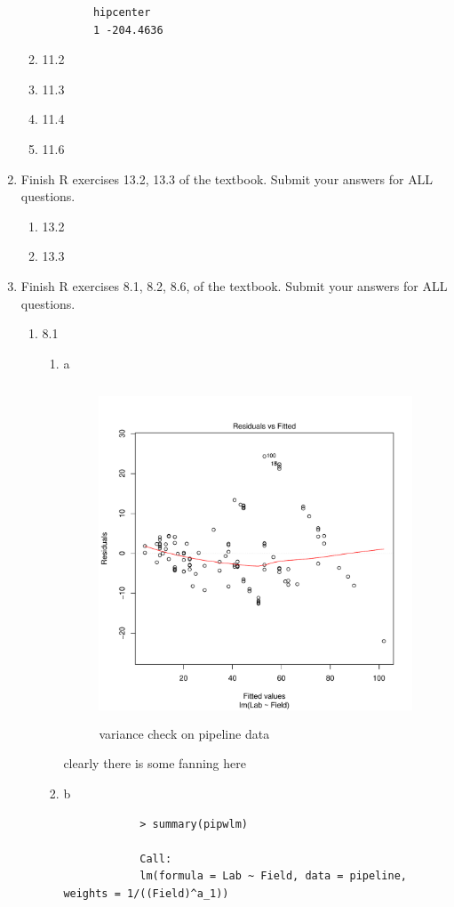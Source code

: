 \documentclass[11pt]{article}
\begin{document}
\begin{enumerate}
\begin{enumerate}
\begin{verbatim}
		hipcenter
		1 -204.4636
	\end{verbatim}
	\item 11.2
	\item 11.3
	\item 11.4
	\item 11.6
\end{enumerate}
\item  Finish R exercises 13.2, 13.3 of the textbook. Submit your
answers for {\color{red}ALL} questions. 
\begin{enumerate}
	\item 13.2
	\item 13.3
\end{enumerate}
\item  Finish R exercises  8.1, 8.2, 8.6, of the textbook. Submit your
answers for {\color{red}ALL} questions. 
\begin{enumerate}
	\item 8.1
	\begin{enumerate}
		\item a
		\begin{figure}[H]
			\centering
			\includegraphics[width=10cm,height=10cm]{pipelinevar.pdf}
			\caption[paic]{variance check on pipeline data}
			\label{divusav}
		\end{figure}
		clearly there is some fanning here
		\item b
		\begin{verbatim}
			> summary(pipwlm)
			
			Call:
			lm(formula = Lab ~ Field, data = pipeline, weights = 1/((Field)^a_1))
			

\end{verbatim}
\end{enumerate}
\end{enumerate}
\end{enumerate}
\end{document}
